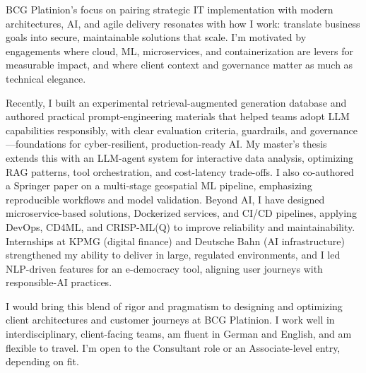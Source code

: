 BCG Platinion’s focus on pairing strategic IT implementation with modern architectures, AI, and agile delivery resonates with how I work: translate business goals into secure, maintainable solutions that scale. I’m motivated by engagements where cloud, ML, microservices, and containerization are levers for measurable impact, and where client context and governance matter as much as technical elegance.

Recently, I built an experimental retrieval-augmented generation database and authored practical prompt-engineering materials that helped teams adopt LLM capabilities responsibly, with clear evaluation criteria, guardrails, and governance—foundations for cyber-resilient, production-ready AI. My master’s thesis extends this with an LLM-agent system for interactive data analysis, optimizing RAG patterns, tool orchestration, and cost-latency trade-offs. I also co-authored a Springer paper on a multi-stage geospatial ML pipeline, emphasizing reproducible workflows and model validation. Beyond AI, I have designed microservice-based solutions, Dockerized services, and CI/CD pipelines, applying DevOps, CD4ML, and CRISP-ML(Q) to improve reliability and maintainability. Internships at KPMG (digital finance) and Deutsche Bahn (AI infrastructure) strengthened my ability to deliver in large, regulated environments, and I led NLP-driven features for an e-democracy tool, aligning user journeys with responsible-AI practices.

I would bring this blend of rigor and pragmatism to designing and optimizing client architectures and customer journeys at BCG Platinion. I work well in interdisciplinary, client-facing teams, am fluent in German and English, and am flexible to travel. I’m open to the Consultant role or an Associate-level entry, depending on fit.